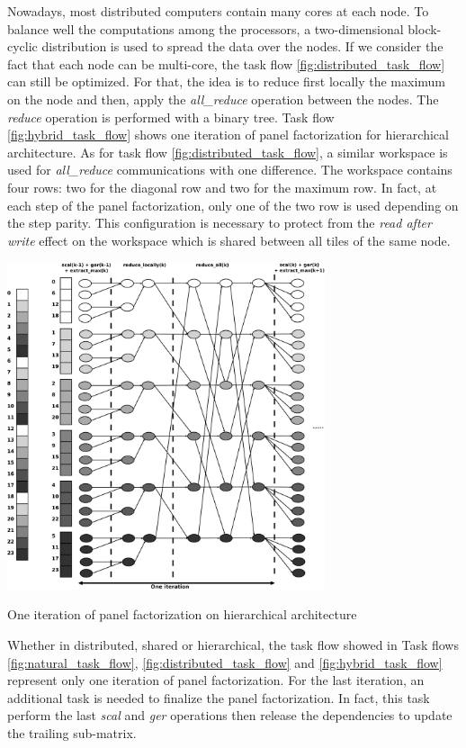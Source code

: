 Nowadays, most distributed computers contain many cores at each node. To balance well the computations among the processors, a two-dimensional block-cyclic distribution is used to spread the data over the nodes\cite{DGW:SHPCC92}.
If we consider the fact that each node can be multi-core, the task flow \ref{fig:distributed_task_flow} can still be optimized. For that, the idea is to reduce first locally the maximum on the node and then, apply the \emph{all\_reduce} operation between the nodes. The \emph{reduce} operation is performed with a binary tree. Task flow \ref{fig:hybrid_task_flow} shows one iteration of panel factorization for hierarchical architecture. As for task flow \ref{fig:distributed_task_flow}, a similar workspace is used for \emph{all\_reduce} communications with one difference. The workspace contains four rows: two for the diagonal row and two for the maximum row. In fact, at each step of the panel factorization, only one of the two row is used depending on the step parity. This configuration is necessary to protect from the \emph{read after write} effect on the workspace  which is shared between all tiles of the same node.

\begin{taskflow}[!ht]
\centering
\includegraphics[width=0.7\textwidth]{figures/hybrid_tf_bw.pdf}
\caption{One iteration of panel factorization on hierarchical architecture \label{fig:hybrid_task_flow}}
\end{taskflow}
 
Whether in distributed, shared or hierarchical, the task flow showed in Task flows \ref{fig:natural_task_flow}, \ref{fig:distributed_task_flow} and \ref{fig:hybrid_task_flow} represent only one iteration of panel factorization. For the last iteration, an additional task is needed to finalize the panel factorization. In fact, this task perform the last \emph{scal} and \emph{ger} operations then release the dependencies to update the trailing sub-matrix.

